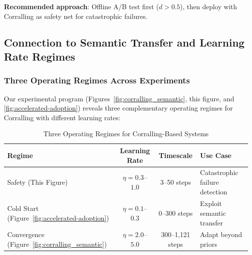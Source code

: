 \textbf{Recommended approach}: Offline A/B test first ($d > 0.5$), then deploy with Corralling as safety net for catastrophic failures.

\subsection{Connection to Semantic Transfer and Learning Rate Regimes}

\subsubsection{Three Operating Regimes Across Experiments}

Our experimental program (Figures~\ref{fig:corralling_semantic}, this figure, and \ref{fig:accelerated-adoption}) reveals three complementary operating regimes for Corralling with different learning rates:

\begin{table}[h]
\centering
\caption{Three Operating Regimes for Corralling-Based Systems}
\label{tab:three_regimes}
\begin{tabular}{lccl}
\toprule
\textbf{Regime} & \textbf{Learning Rate} & \textbf{Timescale} & \textbf{Use Case} \\
\midrule
Safety (This Figure) & $\eta=0.3$--$1.0$ & 3--50 steps & Catastrophic failure detection \\
Cold Start (Figure~\ref{fig:accelerated-adoption}) & $\eta=0.1$--$0.3$ & 0--300 steps & Exploit semantic transfer \\
Convergence (Figure~\ref{fig:corralling_semantic}) & $\eta=2.0$--$5.0$ & 300--1,121 steps & Adapt beyond priors \\
\bottomrule
\end{tabular}
\end{table}

